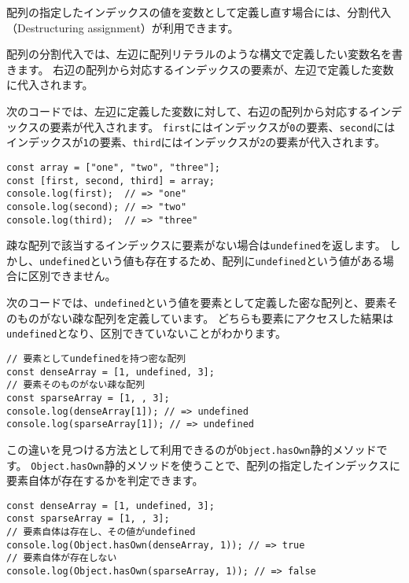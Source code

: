 配列の指定したインデックスの値を変数として定義し直す場合には、分割代入（Destructuring
assignment）が利用できます。

配列の分割代入では、左辺に配列リテラルのような構文で定義したい変数名を書きます。
右辺の配列から対応するインデックスの要素が、左辺で定義した変数に代入されます。

次のコードでは、左辺に定義した変数に対して、右辺の配列から対応するインデックスの要素が代入されます。
\texttt{first}にはインデックスが\texttt{0}の要素、\texttt{second}にはインデックスが\texttt{1}の要素、\texttt{third}にはインデックスが\texttt{2}の要素が代入されます。

\begin{lstlisting}
const array = ["one", "two", "three"];
const [first, second, third] = array;
console.log(first);  // => "one"
console.log(second); // => "two"
console.log(third);  // => "three"
\end{lstlisting}

\begin{tcolorbox}[enhanced jigsaw,breakable,title=undefinedの要素と未定義の要素の違い]\label{diff-undefined-and-no-element}

疎な配列で該当するインデックスに要素がない場合は\texttt{undefined}を返します。
しかし、\texttt{undefined}という値も存在するため、配列に\texttt{undefined}という値がある場合に区別できません。

次のコードでは、\texttt{undefined}という値を要素として定義した密な配列と、要素そのものがない疎な配列を定義しています。
どちらも要素にアクセスした結果は\texttt{undefined}となり、区別できていないことがわかります。

\begin{lstlisting}
// 要素としてundefinedを持つ密な配列
const denseArray = [1, undefined, 3];
// 要素そのものがない疎な配列
const sparseArray = [1, , 3];
console.log(denseArray[1]); // => undefined
console.log(sparseArray[1]); // => undefined
\end{lstlisting}

この違いを見つける方法として利用できるのが\texttt{Object.hasOwn}静的メソッドです。
\texttt{Object.hasOwn}静的メソッドを使うことで、配列の指定したインデックスに要素自体が存在するかを判定できます。

\begin{lstlisting}
const denseArray = [1, undefined, 3];
const sparseArray = [1, , 3];
// 要素自体は存在し、その値がundefined
console.log(Object.hasOwn(denseArray, 1)); // => true
// 要素自体が存在しない
console.log(Object.hasOwn(sparseArray, 1)); // => false
\end{lstlisting}
\end{tcolorbox}

